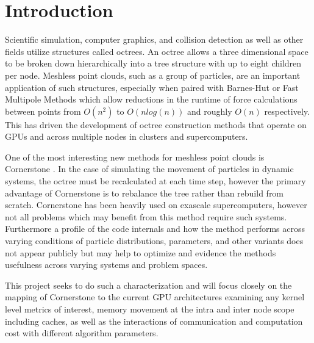 \section{Introduction}
\label{sec:introduction}

Scientific simulation, computer graphics, and collision detection as well as other fields utilize structures called octrees. An octree allows a three dimensional space to be broken down hierarchically into a tree structure with up to eight children per node. Meshless point clouds, such as a group of particles, are an important application of such structures, especially when paired with Barnes-Hut or Fast Multipole Methods which allow reductions in the runtime of force calculations between points from $O(n^2)$ to $O(nlog(n))$ and roughly $O(n)$ respectively. This has driven the development of octree construction methods that operate on GPUs and across multiple nodes in clusters and supercomputers. 

One of the most interesting new methods for meshless point clouds is Cornerstone \cite{cornerstone}. In the case of simulating the movement of particles in dynamic systems, the octree must be recalculated at each time step, however the primary advantage of Cornerstone is to rebalance the tree rather than rebuild from scratch. Cornerstone has been heavily used on exascale supercomputers, however not all problems which may benefit from this method require such systems. Furthermore a profile of the code internals and how the method performs across varying conditions of particle distributions, parameters, and other variants does not appear publicly but may help to optimize and evidence the methods usefulness across varying systems and problem spaces. 

This project seeks to do such a characterization and will focus closely on the mapping of Cornerstone to the current GPU architectures examining any kernel level metrics of interest, memory movement at the intra and inter node scope including caches, as well as the interactions of communication and computation cost with different algorithm parameters.
